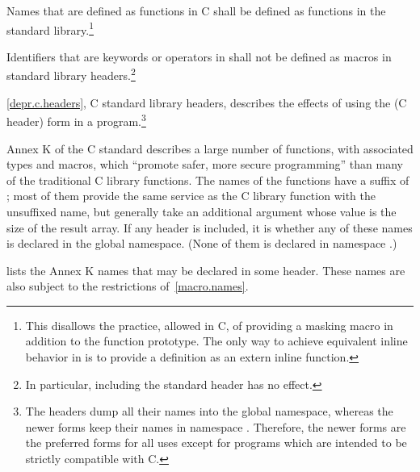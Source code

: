\pnum
Names that are defined as functions in C shall be defined as functions in the
\Cpp{} standard library.\footnote{This disallows the practice, allowed in C, of
providing a masking macro in addition to the function prototype. The only way to
achieve equivalent inline behavior in \Cpp{} is to provide a definition as an
extern inline function.}

\pnum
Identifiers that are keywords or operators in \Cpp{} shall not be defined as
macros in \Cpp{} standard library headers.\footnote{In particular, including the
standard header  has no effect.}

\pnum
\ref{depr.c.headers}, C standard library headers, describes the effects of using
the  (C header) form in a \Cpp{} program.\footnote{ The
 headers dump all their names into the global namespace, whereas the
newer forms keep their names in namespace . Therefore, the newer
forms are the preferred forms for all uses except for \Cpp{} programs which are
intended to be strictly compatible with C. }

\pnum
Annex K of the C standard describes a large number of functions,
with associated types and macros,
which ``promote safer, more secure programming''
than many of the traditional C library functions.
The names of the functions have a suffix of ;
most of them provide the same service
as the C library function with the unsuffixed name,
but generally take an additional argument
whose value is the size of the result array.
If any \Cpp{} header is included,
it is 
whether any of these names
is declared in the global namespace.
(None of them is declared in namespace .)

\pnum
{} lists the Annex K names
that may be declared in some header.
These names are also subject to the restrictions of~\ref{macro.names}.

